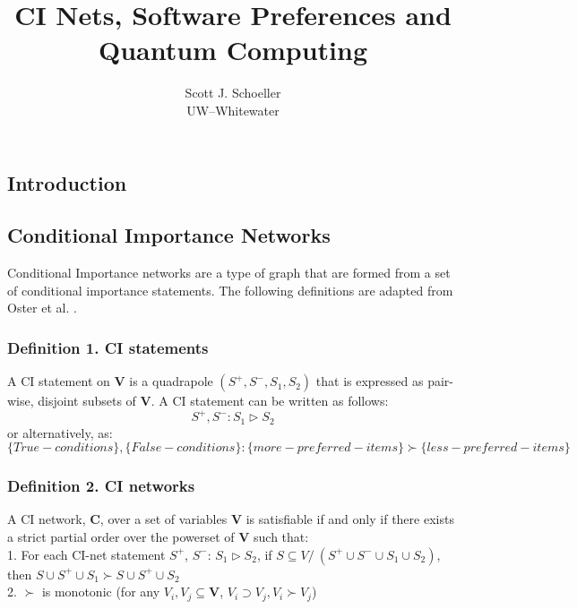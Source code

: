 \documentclass[12pt]{article}
\title{CI Nets, Software Preferences and Quantum Computing}
\author{Scott J. Schoeller\\UW--Whitewater}
\date{}
\begin{document}
\maketitle

\newpage
\begin{flushleft}
\section{Introduction}
\subsection{Conditional Importance Networks}
Conditional Importance networks are a type of graph that are formed from a set of conditional importance statements. The following definitions are adapted from Oster et al. \cite{  oster_efficient_2017, oster_scalable_2015}.\\

\subsubsection*{Definition 1. CI statements}
A CI statement on $\mathbf{V}$ is a quadrapole $(S^+ ,S^-, S_1, S_2)$ that is expressed as pair-wise, disjoint subsets of $\mathbf{V}$.
A CI statement can be written as follows:
\small
\begin{equation*}
S^+, S^- : S_1 \vartriangleright S_2 
\end{equation*}
or alternatively, as:
\begin{equation*}
\{True-conditions \}, \{False-conditions \}: \{more-preferred-items \} \succ \{less-preferred-items \}
\end{equation*}
\normalsize

\subsubsection*{Definition 2. CI networks}
A CI network, $\mathbf{C}$, over a set of variables $\textbf{V}$ is satisfiable if and only if there exists a strict partial order over the powerset of $\mathbf{V}$ such that:\\
1. For each CI-net statement $S^+$, $S^{-}$: $S_1 \vartriangleright S_2$, if $S \subseteq V /\ (S^+ \cup S^- \cup S_1 \cup S_2)$, then $S \cup S^+ \cup S_1 \succ S \cup S^+ \cup S_2$\\
2. $\succ$ is monotonic (for any $V_i, V_j \subseteq \mathbf{V}$, $V_i  \supset  V_j,  V_i \succ V_j$)


\end{flushleft}
\end{document}
